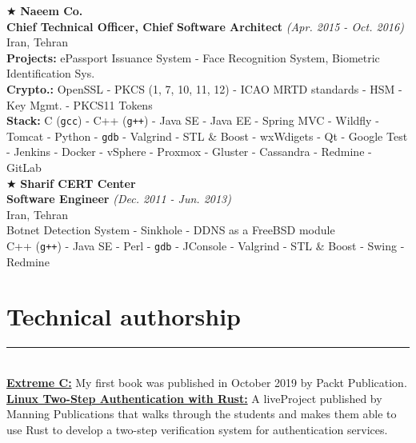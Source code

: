 \documentclass[10pt,a4paper]{article}
\begin{document}
\noindent $\bigstar$ \hspace{0.1cm} \large \textbf{Naeem Co.} \\
\indent \small \textbf{Chief Technical Officer, Chief Software Architect} \textsl{(Apr. 2015 - Oct. 2016)} \\
\indent \textnormal{Iran, Tehran} \\
\indent \textbullet \hspace{0.05cm} \textbf{Projects:} ePassport Issuance System - Face Recognition System, Biometric Identification Sys. \\
\indent \textbullet \hspace{0.05cm} \textbf{Crypto.:} OpenSSL - PKCS (1, 7, 10, 11, 12) - ICAO MRTD standards - HSM - Key Mgmt. - PKCS11 Tokens\\
\indent \textbullet \hspace{0.05cm} \textbf{Stack:} C (\texttt{gcc}) - C++ (\texttt{g++}) - Java SE - Java EE - Spring MVC - Wildfly - Tomcat - Python - \texttt{gdb} - Valgrind - STL \& Boost - wxWdigets - Qt - Google Test - Jenkins - Docker - vSphere - Proxmox - Gluster - Cassandra - Redmine - GitLab \\

\noindent $\bigstar$ \hspace{0.1cm} \large \textbf{Sharif CERT Center} \\ 
\indent \small \textbf{Software Engineer} \textsl{(Dec. 2011 - Jun. 2013)} \\
\indent \textnormal{Iran, Tehran} \\ 
\indent \textbullet \hspace{0.05cm} Botnet Detection System - Sinkhole - DDNS as a FreeBSD module \\
\indent \textbullet \hspace{0.05cm} C++ (\texttt{g++}) - Java SE - Perl - \texttt{gdb} - JConsole - Valgrind - STL \& Boost - Swing - Redmine \\

\section{Technical authorship}
\noindent \rule {18.0cm}{0.2pt} \\
\textbullet \hspace{0.05cm} \href{https://www.amazon.com/Extreme-Taking-Concurrency-advanced-capabilities/dp/1789343623}{\textbf{Extreme C:}} My first book was published in October 2019 by Packt Publication. \\
\textbullet \hspace{0.05cm} \href{https://www.manning.com/liveproject/linux-two-step-authentication-with-rust}{\textbf{Linux Two-Step Authentication with Rust:}} A liveProject published by Manning Publications that walks through the students and makes them able to use Rust to develop a two-step verification system for authentication services. \\
    
\end{document}
